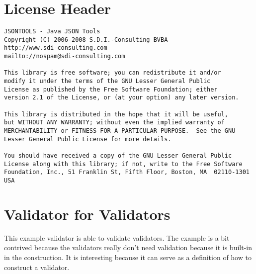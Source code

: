 \documentclass[a4paper]{article}
\begin{document}
\appendix

\newpage
\section{ License Header }
\label{license}

\begin{verbatim}
JSONTOOLS - Java JSON Tools
Copyright (C) 2006-2008 S.D.I.-Consulting BVBA
http://www.sdi-consulting.com
mailto://nospam@sdi-consulting.com

This library is free software; you can redistribute it and/or
modify it under the terms of the GNU Lesser General Public
License as published by the Free Software Foundation; either
version 2.1 of the License, or (at your option) any later version.

This library is distributed in the hope that it will be useful,
but WITHOUT ANY WARRANTY; without even the implied warranty of
MERCHANTABILITY or FITNESS FOR A PARTICULAR PURPOSE.  See the GNU
Lesser General Public License for more details.

You should have received a copy of the GNU Lesser General Public
License along with this library; if not, write to the Free Software
Foundation, Inc., 51 Franklin St, Fifth Floor, Boston, MA  02110-1301  USA 
\end{verbatim}

\newpage
\section{ Validator for Validators }

 This example validator is able to validate validators. The example is a bit contrived because the validators really don't need validation because it is built-in in the construction. It is interesting because it can serve as a definition of how to construct a validator.
 
\end{document}
